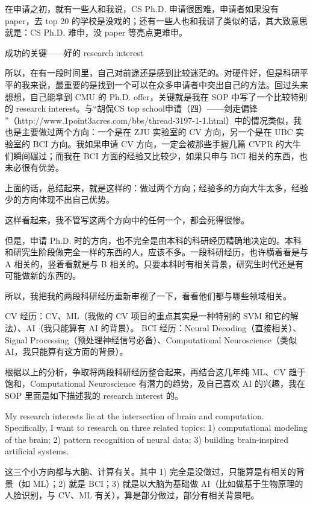 \documentclass[11pt,fleqn,openany]{book} %
\begin{document}
在申请之初，就有一些人和我说，CS Ph.D. 申请很困难，申请者如果没有 paper，去 top 20 的学校是没戏的；还有一些人也和我讲了类似的话，其大致意思就是：CS Ph.D. 难申，没 paper 等亮点更难申。

成功的关键——好的 research interest

所以，在有一段时间里，自己对前途还是感到比较迷茫的。对硬件好，但是科研平平的我来说，最重要的是找到一个可以在众多申请者中突出自己的方法。回过头来想想，自己能拿到 CMU 的 Ph.D. offer，关键就是我在 SOP 中写了一个比较特别的 research interest。与“胡侃CS top school申请（四）——剑走偏锋 ”（http://www.1point3acres.com/bbs/thread-3197-1-1.html）中的情况类似，我也是主要做过两个方向：一个是在 ZJU 实验室的 CV 方向，另一个是在 UBC 实验室的 BCI 方向。我如果申请 CV 方向，一定会被那些手握几篇 CVPR 的大牛们瞬间碾过；而我在 BCI 方面的经验又比较少，如果只申与 BCI 相关的东西，也未必很有优势。

上面的话，总结起来，就是这样的：做过两个方向；经验多的方向大牛太多，经验少的方向体现不出自己优势。

这样看起来，我不管写这两个方向中的任何一个，都会死得很惨。

但是，申请 Ph.D. 时的方向，也不完全是由本科的科研经历精确地决定的。本科和研究生阶段做完全一样的东西的人，应该不多。一段科研经历，也许横着看是与 A 相关的，竖着看就是与 B 相关的。只要本科时有相关背景，研究生时代还是有可能做新的东西的。

所以，我把我的两段科研经历重新审视了一下，看看他们都与哪些领域相关。

CV 经历：CV、ML（我做的 CV 项目的重点其实是一种特别的 SVM 和它的解法）、AI（我只能算有 AI 的背景）。
BCI 经历：Neural Decoding（直接相关）、Signal Processing（预处理神经信号必备）、Computational Neuroscience（类似 AI，我只能算有这方面的背景）。

根据以上的分析，争取将两段科研经历整合起来，再结合这几年纯 ML、CV 趋于饱和，Computational Neuroscience 有潜力的趋势，及自己喜欢 AI 的兴趣，我在 SOP 里面是如下描述我的 research interest 的。

My research interests lie at the intersection of brain and computation. Specifically, I want to research on three related topics: 1) computational modeling of the brain; 2) pattern recognition of neural data; 3) building brain-inspired artificial systems.

这三个小方向都与大脑、计算有关。其中 1) 完全是没做过，只能算是有相关的背景（如 ML）；2) 就是 BCI；3) 就是以大脑为基础做 AI（比如做基于生物原理的人脸识别，与 CV、ML 有关），算是部分做过，部分有相关背景吧。
\end{document}
